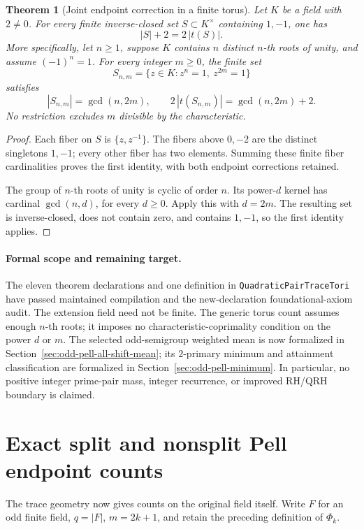 \documentclass[11pt]{article}
\newtheorem{theorem}{Theorem}[section]
\begin{document}
\begin{theorem}[Joint endpoint correction in a finite torus]
\label{thm:odd-pell-torus-kernel-count}
Let \(K\) be a field with \(2\ne0\). For every finite inverse-closed
set \(S\subset K^\times\) containing \(1,-1\), one has
\[
 |S|+2=2\,|t(S)|.
\]
More specifically, let \(n\ge1\), suppose \(K\) contains \(n\) distinct
\(n\)-th roots of unity, and assume \((-1)^n=1\). For every integer
\(m\ge0\), the finite set
\[
 S_{n,m}=\{z\in K:z^n=1,\ z^{2m}=1\}
\]
satisfies
\[
 |S_{n,m}|=\gcd(n,2m),\qquad
 2\,|t(S_{n,m})|=\gcd(n,2m)+2.
\]
No restriction excludes \(m\) divisible by the characteristic.
\end{theorem}
\begin{proof}
Each fiber on \(S\) is \(\{z,z^{-1}\}\).
The fibers above \(0,-2\) are the distinct singletons \(1,-1\);
every other fiber has two elements. Summing these finite fiber
cardinalities proves the first identity, with both endpoint corrections
retained.

The group of \(n\)-th roots of unity is cyclic of order \(n\).
Its power-\(d\) kernel has cardinal \(\gcd(n,d)\), for every \(d\ge0\).
Apply this with \(d=2m\). The resulting set is inverse-closed,
does not contain zero, and contains \(1,-1\), so the first identity applies.
\end{proof}

\paragraph{Formal scope and remaining target.}
The eleven theorem declarations and one definition in
\texttt{QuadraticPairTraceTori} have passed maintained compilation
and the new-declaration foundational-axiom audit.
The extension field need not be finite. The generic torus count assumes
enough \(n\)-th roots; it imposes no characteristic-coprimality
condition on the power \(d\) or \(m\).
The selected odd-semigroup weighted mean is now formalized in
Section~\ref{sec:odd-pell-all-shift-mean}; its \(2\)-primary minimum and
attainment classification are formalized in
Section~\ref{sec:odd-pell-minimum}. In particular,
no positive integer prime-pair mass, integer recurrence, or improved
RH/QRH boundary is claimed.

\section{Exact split and nonsplit Pell endpoint counts}
\label{sec:odd-pell-native-sector-counts}
The trace geometry now gives counts on the original field itself.
Write \(F\) for an odd finite field, \(q=|F|\),
\(m=2k+1\), and retain the preceding definition of \(\Phi_k\).
\end{document}
